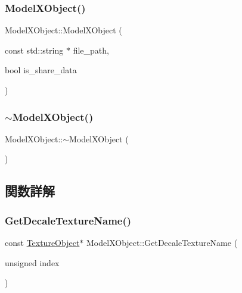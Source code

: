 \subsubsection{\texorpdfstring{Model\+X\+Object()}{ModelXObject()}}
{\footnotesize\ttfamily Model\+X\+Object\+::\+Model\+X\+Object (\begin{DoxyParamCaption}\item[{const std\+::string $\ast$}]{file\+\_\+path,  }\item[{bool}]{is\+\_\+share\+\_\+data }\end{DoxyParamCaption})}

\mbox{\label{class_model_x_object_a33553f8ab78dfd3c9d571a048ae85324}} 
\subsubsection{\texorpdfstring{$\sim$\+Model\+X\+Object()}{~ModelXObject()}}
{\footnotesize\ttfamily Model\+X\+Object\+::$\sim$\+Model\+X\+Object (\begin{DoxyParamCaption}{ }\end{DoxyParamCaption})\hspace{0.3cm}{\ttfamily [virtual]}}



\subsection{関数詳解}
\mbox{\label{class_model_x_object_afd57d5b6b74817f4d69047640e69f14e}} 
\subsubsection{\texorpdfstring{Get\+Decale\+Texture\+Name()}{GetDecaleTextureName()}}
{\footnotesize\ttfamily const \mbox{\hyperlink{class_texture_object}{Texture\+Object}}$\ast$ Model\+X\+Object\+::\+Get\+Decale\+Texture\+Name (\begin{DoxyParamCaption}\item[{unsigned}]{index }\end{DoxyParamCaption})\hspace{0.3cm}{\ttfamily [inline]}}

